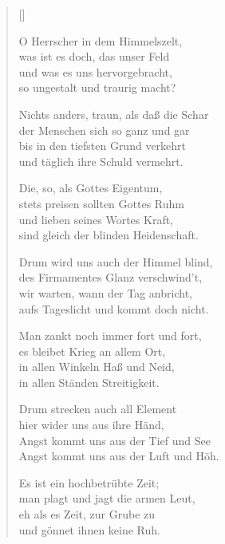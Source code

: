 \begin{multicols}{2}
\settowidth{\versewidth}{Nichts anders, traun, als daß die Schar}
\begin{verse}[\versewidth]

 O Herrscher in dem Himmelszelt,\\
was ist es doch, das unser Feld\\
und was es uns hervorgebracht,\\
so ungestalt und traurig macht?

 Nichts anders, traun, als daß die Schar\\
der Menschen sich so ganz und gar\\
bis in den tiefsten Grund verkehrt\\
und täglich ihre Schuld vermehrt.

 Die, so, als Gottes Eigentum,\\
stets preisen sollten Gottes Ruhm\\
und lieben seines Wortes Kraft,\\
sind gleich der blinden Heidenschaft.

 Drum wird uns auch der Himmel blind,\\
des Firmamentes Glanz verschwind't,\\
wir warten, wann der Tag anbricht,\\
aufs Tageslicht und kommt doch nicht.

 Man zankt noch immer fort und fort,\\
es bleibet Krieg an allem Ort,\\
in allen Winkeln Haß und Neid,\\
in allen Ständen Streitigkeit.

 Drum strecken auch all Element\\
hier wider uns aus ihre Händ,\\
Angst kommt uns aus der Tief und See\\
Angst kommt uns aus der Luft und Höh.

 Es ist ein hochbetrübte Zeit;\\
man plagt und jagt die armen Leut,\\
eh als es Zeit, zur Grube zu\\
und gönnet ihnen keine Ruh.


\end{verse}
\end{multicols}
